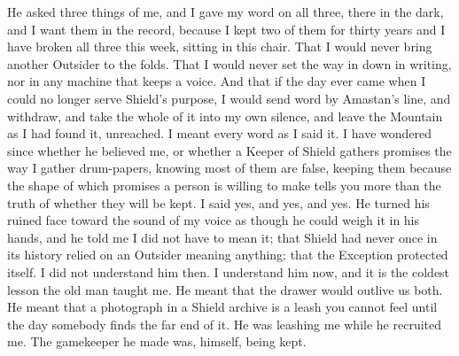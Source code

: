 He asked three things of me, and I gave my word on all three, there in the dark, and I want them in the record, because I kept two of them for thirty years and I have broken all three this week, sitting in this chair. That I would never bring another Outsider to the folds. That I would never set the way in down in writing, nor in any machine that keeps a voice. And that if the day ever came when I could no longer serve Shield's purpose, I would send word by Amastan's line, and withdraw, and take the whole of it into my own silence, and leave the Mountain as I had found it, unreached. I meant every word as I said it. I have wondered since whether he believed me, or whether a Keeper of Shield gathers promises the way I gather drum-papers, knowing most of them are false, keeping them because the shape of which promises a person is willing to make tells you more than the truth of whether they will be kept. I said yes, and yes, and yes. He turned his ruined face toward the sound of my voice as though he could weigh it in his hands, and he told me I did not have to mean it; that Shield had never once in its history relied on an Outsider meaning anything; that the Exception protected itself. I did not understand him then. I understand him now, and it is the coldest lesson the old man taught me. He meant that the drawer would outlive us both. He meant that a photograph in a Shield archive is a leash you cannot feel until the day somebody finds the far end of it. He was leashing me while he recruited me. The gamekeeper he made was, himself, being kept.\par


